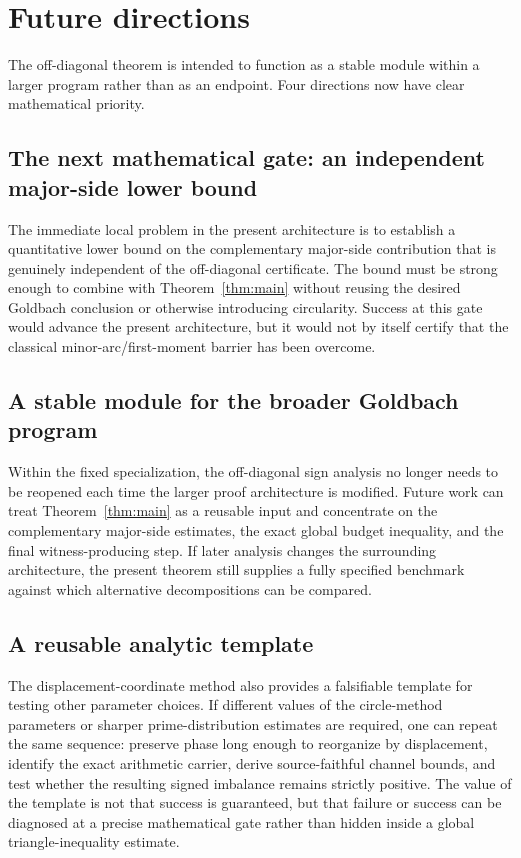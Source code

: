 \documentclass[11pt]{article}
\theoremstyle{definition}
\begin{document}
\section{Future directions}\label{sec:future}

The off-diagonal theorem is intended to function as a stable module within a larger program rather than as an endpoint. Four directions now have clear mathematical priority.

\subsection{The next mathematical gate: an independent major-side lower bound}

The immediate local problem in the present architecture is to establish a quantitative lower bound on the complementary major-side contribution that is genuinely independent of the off-diagonal certificate. The bound must be strong enough to combine with Theorem~\ref{thm:main} without reusing the desired Goldbach conclusion or otherwise introducing circularity. Success at this gate would advance the present architecture, but it would not by itself certify that the classical minor-arc/first-moment barrier has been overcome.

\subsection{A stable module for the broader Goldbach program}

Within the fixed specialization, the off-diagonal sign analysis no longer needs to be reopened each time the larger proof architecture is modified. Future work can treat Theorem~\ref{thm:main} as a reusable input and concentrate on the complementary major-side estimates, the exact global budget inequality, and the final witness-producing step. If later analysis changes the surrounding architecture, the present theorem still supplies a fully specified benchmark against which alternative decompositions can be compared.

\subsection{A reusable analytic template}

The displacement-coordinate method also provides a falsifiable template for testing other parameter choices. If different values of the circle-method parameters or sharper prime-distribution estimates are required, one can repeat the same sequence: preserve phase long enough to reorganize by displacement, identify the exact arithmetic carrier, derive source-faithful channel bounds, and test whether the resulting signed imbalance remains strictly positive. The value of the template is not that success is guaranteed, but that failure or success can be diagnosed at a precise mathematical gate rather than hidden inside a global triangle-inequality estimate.
\end{document}

